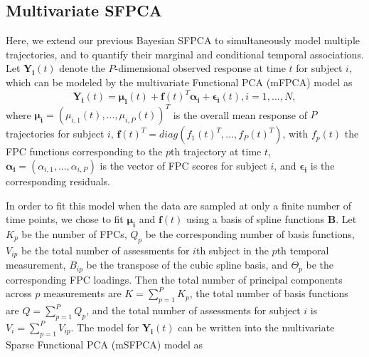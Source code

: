 \documentclass[aoas,preprint]{imsart}
\begin{document}
\subsection{Multivariate SFPCA}
Here, we extend our previous Bayesian SFPCA to simultaneously model multiple trajectories, and to quantify their marginal and conditional temporal associations. Let $\boldsymbol{Y_i}(t)$ denote the $P$-dimensional observed response at time $t$ for subject $i$, which can be modeled by the multivariate Functional PCA (mFPCA) model as
\begin{equation}
\boldsymbol{Y_i}(t) = \boldsymbol{\mu_i}(t) + \boldsymbol{f}(t)^T \boldsymbol{\alpha_{i}} + \boldsymbol{\epsilon_i}(t), i = 1, ..., N,
\end{equation}
where $\boldsymbol{\mu_i} = (\mu_{i,1}(t), ..., \mu_{i,P}(t))^T$ is the overall mean response of $P$ trajectories for subject $i$, $\boldsymbol{f}(t)^T = diag(f_{1}(t)^T, ..., f_{P}(t)^T)$, with $f_{p}(t)$ the FPC functions corresponding to the $p$th trajectory at time $t$, $\boldsymbol{\alpha_{i}} = (\alpha_{i,1}, ..., \alpha_{i,P})$ is the vector of FPC scores for subject $i$, and $\boldsymbol{\epsilon_i}$ is the corresponding residuals.

In order to fit this model when the data are sampled at only a finite number of time points, we chose to fit $\boldsymbol{\mu_i}$ and $\boldsymbol{f}(t)$ using a basis of spline functions $\boldsymbol{B}$. Let $K_p$ be the number of FPCs, $Q_p$ be the corresponding number of basis functions, $V_{ip}$ be the total number of assessments for $i$th subject in the $p$th temporal measurement, $B_{ip}$ be the transpose of the cubic spline basis, and $\Theta_p$ be the corresponding FPC loadings. Then the total number of principal components across $p$ measurements are $K= \sum_{p=1}^P K_p$, the total number of basis functions are $Q= \sum_{p=1}^PQ_p$, and the total number of assessments for subject $i$ is $V_i= \sum_{p=1}^PV_{ip}$. The model for $\boldsymbol{Y_i}(t)$ can be written into the multivariate Sparse Functional PCA (mSFPCA) model as
\end{document}
